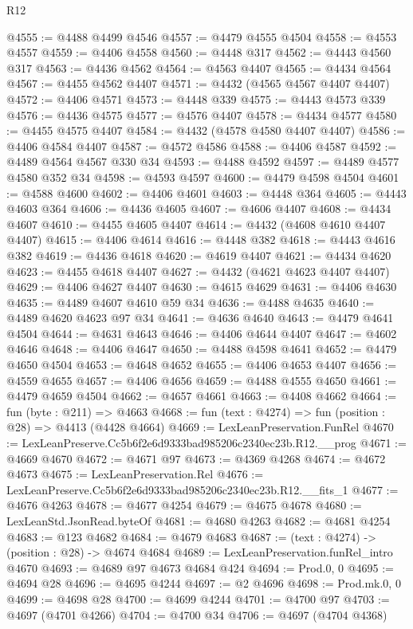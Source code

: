\begin{lexlean}{R12}
\begin{coremodule}
@4555 := @4488 @4499 @4546
@4557 := @4479 @4555 @4504
@4558 := @4553 @4557
@4559 := @4406 @4558
@4560 := @4448 @317
@4562 := @4443 @4560 @317
@4563 := @4436 @4562
@4564 := @4563 @4407
@4565 := @4434 @4564
@4567 := @4455 @4562 @4407
@4571 := @4432 (@4565 @4567 @4407 @4407)
@4572 := @4406 @4571
@4573 := @4448 @339
@4575 := @4443 @4573 @339
@4576 := @4436 @4575
@4577 := @4576 @4407
@4578 := @4434 @4577
@4580 := @4455 @4575 @4407
@4584 := @4432 (@4578 @4580 @4407 @4407)
@4586 := @4406 @4584 @4407
@4587 := @4572 @4586
@4588 := @4406 @4587
@4592 := @4489 @4564 @4567 @330 @34
@4593 := @4488 @4592
@4597 := @4489 @4577 @4580 @352 @34
@4598 := @4593 @4597
@4600 := @4479 @4598 @4504
@4601 := @4588 @4600
@4602 := @4406 @4601
@4603 := @4448 @364
@4605 := @4443 @4603 @364
@4606 := @4436 @4605
@4607 := @4606 @4407
@4608 := @4434 @4607
@4610 := @4455 @4605 @4407
@4614 := @4432 (@4608 @4610 @4407 @4407)
@4615 := @4406 @4614
@4616 := @4448 @382
@4618 := @4443 @4616 @382
@4619 := @4436 @4618
@4620 := @4619 @4407
@4621 := @4434 @4620
@4623 := @4455 @4618 @4407
@4627 := @4432 (@4621 @4623 @4407 @4407)
@4629 := @4406 @4627 @4407
@4630 := @4615 @4629
@4631 := @4406 @4630
@4635 := @4489 @4607 @4610 @59 @34
@4636 := @4488 @4635
@4640 := @4489 @4620 @4623 @97 @34
@4641 := @4636 @4640
@4643 := @4479 @4641 @4504
@4644 := @4631 @4643
@4646 := @4406 @4644 @4407
@4647 := @4602 @4646
@4648 := @4406 @4647
@4650 := @4488 @4598 @4641
@4652 := @4479 @4650 @4504
@4653 := @4648 @4652
@4655 := @4406 @4653 @4407
@4656 := @4559 @4655
@4657 := @4406 @4656
@4659 := @4488 @4555 @4650
@4661 := @4479 @4659 @4504
@4662 := @4657 @4661
@4663 := @4408 @4662
@4664 := fun (byte : @211) => @4663
@4668 := fun (text : @4274) => fun (position : @28) => @4413 (@4428 @4664)
@4669 := LexLeanPreservation.FunRel
@4670 := LexLeanPreserve.Cc5b6f2e6d9333bad985206c2340ec23b.R12.__prog
@4671 := @4669 @4670
@4672 := @4671 @97
@4673 := @4369 @4268
@4674 := @4672 @4673
@4675 := LexLeanPreservation.Rel
@4676 := LexLeanPreserve.Cc5b6f2e6d9333bad985206c2340ec23b.R12.__fits_1
@4677 := @4676 @4263
@4678 := @4677 @4254
@4679 := @4675 @4678
@4680 := LexLeanStd.JsonRead.byteOf
@4681 := @4680 @4263
@4682 := @4681 @4254
@4683 := @123 @4682
@4684 := @4679 @4683
@4687 := (text : @4274) -> (position : @28) -> @4674 @4684
@4689 := LexLeanPreservation.funRel_intro @4670
@4693 := @4689 @97 @4673 @4684 @424
@4694 := Prod.{0, 0}
@4695 := @4694 @28
@4696 := @4695 @4244
@4697 := @2 @4696
@4698 := Prod.mk.{0, 0}
@4699 := @4698 @28
@4700 := @4699 @4244
@4701 := @4700 @97
@4703 := @4697 (@4701 @4266)
@4704 := @4700 @34
@4706 := @4697 (@4704 @4368)

\end{coremodule}
\end{lexlean}
